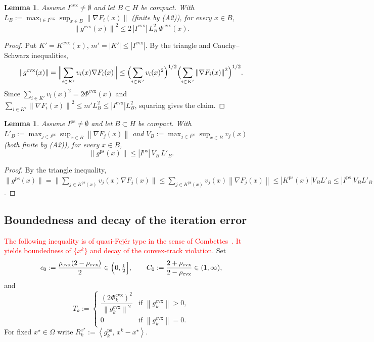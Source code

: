 \documentclass[]{interact}
\theoremstyle{plain}
\newtheorem{lemma}[theorem]{Lemma}
\theoremstyle{definition}
\theoremstyle{remark}
\newcommand{\norm}[1]{\left\lVert #1 \right\rVert}
\newcommand{\abs}[1]{\left\lvert #1 \right\rvert}
\newcommand{\inner}[2]{\left\langle #1,\, #2 \right\rangle}
\newcommand{\cvx}{\mathrm{cvx}}
\newcommand{\ps}{\mathrm{ps}}
\begin{document}
\begin{lemma}\label{lem:bound-cvx}
Assume $I^{\cvx}\ne\emptyset$ and let $B\subset H$ be compact. With $L_B:=\max_{i\in I^{\cvx}}\sup_{x\in B}\norm{\nabla F_i(x)}$ (finite by (A2)), for every $x\in B$,
\[
\norm{g^{\cvx}(x)}^2\le 2\,\abs{I^{\cvx}}\,L_B^2\,\Phi^{\cvx}(x).
\]
\end{lemma}
\begin{proof}
Put $K'=K^{\cvx}(x)$, $m'=\abs{K'}\le\abs{I^{\cvx}}$. By the triangle and Cauchy--Schwarz inequalities,
\[
\norm{g^{\cvx}(x)}=\Bigl\|\sum_{i\in K'}v_i(x)\nabla F_i(x)\Bigr\|
\le\Bigl(\sum_{i\in K'}v_i(x)^2\Bigr)^{1/2}\Bigl(\sum_{i\in K'}\norm{\nabla F_i(x)}^2\Bigr)^{1/2}.
\]
Since $\sum_{i\in K'}v_i(x)^2=2\Phi^{\cvx}(x)$ and $\sum_{i\in K'}\norm{\nabla F_i(x)}^2\le m'L_B^2\le\abs{I^{\cvx}}L_B^2$, squaring gives the claim.
\end{proof}

\begin{lemma}\label{lem:bound-ps}
Assume $I^{\ps}\ne\emptyset$ and let $B\subset H$ be compact. With $L'_B:=\max_{j\in I^{\ps}}\sup_{x\in B}\norm{\nabla F_j(x)}$ and $V_B:=\max_{j\in I^{\ps}}\sup_{x\in B}v_j(x)$ (both finite by (A2)), for every $x\in B$,
\[
\norm{g^{\ps}(x)}\le\abs{I^{\ps}}\,V_B\,L'_B .
\]
\end{lemma}
\begin{proof}
By the triangle inequality, $\norm{g^{\ps}(x)}=\bigl\|\sum_{j\in K^{\ps}(x)}v_j(x)\nabla F_j(x)\bigr\| \le\sum_{j\in K^{\ps}(x)}v_j(x)\norm{\nabla F_j(x)}\le\abs{K^{\ps}(x)}V_BL'_B \le\abs{I^{\ps}}V_BL'_B$.
\end{proof}

\subsection{Boundedness and decay of the iteration error}\label{ssec:bounded}
\leavevmode\textcolor{red}{The following inequality is of quasi-Fej\'er type in the sense of Combettes~\citep{combettes2001quasifejer}. It yields boundedness of $\{x^k\}$ and decay of the convex-track violation.} Set
\begin{equation}\label{eq:c0C0}
c_0:=\frac{\rho_{\cvx}(2-\rho_{\cvx})}{2}\in\Bigl(0,\tfrac12\Bigr],\qquad
C_0:=\frac{2+\rho_{\cvx}}{2-\rho_{\cvx}}\in(1,\infty),
\end{equation}
and
\begin{equation}\label{eq:Tk}
T_k:=\begin{cases}\dfrac{(2\Phi^{\cvx}_k)^2}{\norm{g^{\cvx}_k}^2} & \text{if }\norm{g^{\cvx}_k}>0,\\ 0 & \text{if }\norm{g^{\cvx}_k}=0.\end{cases}
\end{equation}
For fixed $x^\star\in\Omega$ write $R^{x^\star}_k:=\inner{g^{\ps}_k}{x^k-x^\star}$.
\end{document}
